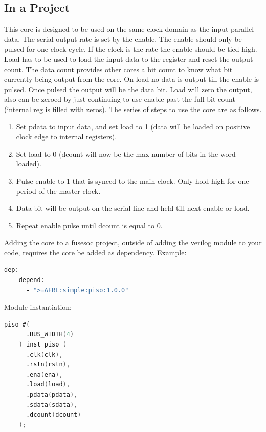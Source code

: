 

\subsection{In a Project}
\par
This core is designed to be used on the same clock domain as the input parallel data. The serial output rate is set by the enable.
The enable should only be pulsed for one clock cycle. If the clock is the rate the enable should be tied high. Load has to be
used to load the input data to the register and reset the output count. The data count provides other cores a bit count to know what bit currently being output from the core. On load no data is output till the enable is pulsed. Once pulsed the output will be the data bit. Load will zero the output, also can be zeroed by just continuing to use enable past the full bit count (internal reg is filled with zeros).
The series of steps to use the core are as follows.
\begin{enumerate}
  \item Set pdata to input data, and set load to 1 (data will be loaded on positive clock edge to internal registers).
  \item Set load to 0 (dcount will now be the max number of bits in the word loaded).
  \item Pulse enable to 1 that is synced to the main clock. Only hold high for one period of the master clock.
  \item Data bit will be output on the serial line and held till next enable or load.
  \item Repeat enable pulse until dcount is equal to 0.
\end{enumerate}

Adding the core to a fusesoc project, outside of adding the verilog module to your code, requires the core be added as dependency.
Example:
\begin{lstlisting}[language=bash]
  dep:
    depend:
      - ">=AFRL:simple:piso:1.0.0"
\end{lstlisting}

Module instantiation:
\begin{lstlisting}[language=Verilog]
    piso #(
      .BUS_WIDTH(4)
    ) inst_piso (
      .clk(clk),
      .rstn(rstn),
      .ena(ena),
      .load(load),
      .pdata(pdata),
      .sdata(sdata),
      .dcount(dcount)
    );
\end{lstlisting}

